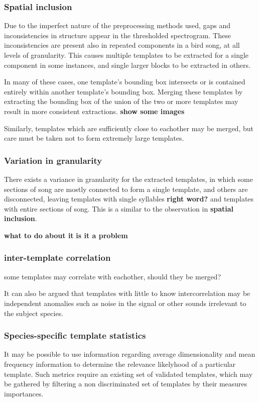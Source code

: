 \subsubsection{Spatial inclusion}
Due to the imperfect nature of the preprocessing methods used, gaps and
inconsistencies in structure appear in the thresholded spectrogram.
These inconsistencies are present also in repeated components in a bird song,
at all levels of granularity.
This causes multiple templates to be extracted for a single component in some
instances, and single larger blocks to be extracted in others.

In many of these cases, one template's bounding box intersects or is contained
entirely within another template's bounding box.
Merging these templates by extracting the bounding box of the union of the two
or more templates may result in more consistent extractions.
\textbf{show some images}

Similarly, templates which are sufficiently close to eachother may be merged,
but care must be taken not to form extremely large templates.

\subsubsection{Variation in granularity}
There exists a variance in granularity for the extracted templates, in which
some sections of song are mostly connected to form a single template, and others
are disconnected, leaving templates with single syllables \textbf{right word?}
and templates with entire sections of song.
This is a similar to the observation in \textbf{spatial inclusion}.

\textbf{what to do about it}
\textbf{is it a problem}


\subsubsection{inter-template correlation}
some templates may correlate with eachother, should they be merged?

It can also be argued that templates with little to know intercorrelation may be
independent anomalies such as noise in the signal or other sounds irrelevant to
the subject species.

\subsubsection{Species-specific template statistics}
It may be possible to use information regarding average dimensionality and mean
frequency information to determine the relevance likelyhood of a particular template.
Such metrics require an existing set of validated templates, which may be gathered
by filtering a non discriminated set of templates by their measures importances.
